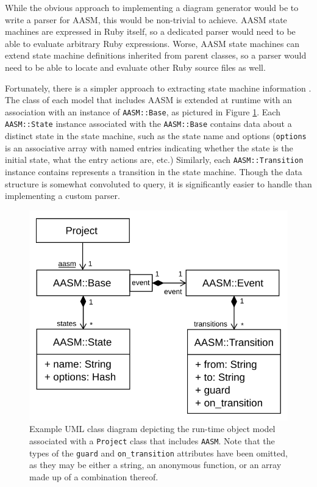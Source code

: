 \documentclass[document.tex]{subfiles}
\begin{document}
While the obvious approach to implementing a diagram generator would be to write a parser for AASM, this would be non-trivial to achieve. AASM state machines are expressed in Ruby itself, so a dedicated parser would need to be able to evaluate arbitrary Ruby expressions. Worse, AASM state machines can extend state machine definitions inherited from parent classes, so a parser would need to be able to locate and evaluate other Ruby source files as well.

Fortunately, there is a simpler approach to extracting state machine information . The class of each model that includes AASM is extended at runtime with an association with an instance of \verb!AASM::Base!, as pictured in Figure \ref{fig:aasm-class-model}. Each \verb!AASM::State! instance associated with the \verb!AASM::Base! contains data about a distinct state in the state machine, such as the state name and options (\verb!options! is an associative array with named entries indicating whether the state is the initial state, what the entry actions are, etc.) Similarly, each \verb!AASM::Transition! instance contains represents a transition in the state machine. Though the data structure is somewhat convoluted to query, it is significantly easier to handle than implementing a custom parser.

\begin{figure}[!htbp]
  \centering
  \includegraphics{./img/case-study-fourth-year-system/aasm-class-model}
  \cprotect
  \caption{Example UML class diagram depicting the run-time object model associated with a \verb!Project! class that includes \verb!AASM!. Note that the types of the \verb!guard! and \verb!on_transition! attributes have been omitted, as they may be either a string, an anonymous function, or an array made up of a combination thereof.}
  \label{fig:aasm-class-model}
\end{figure}
\end{document}

